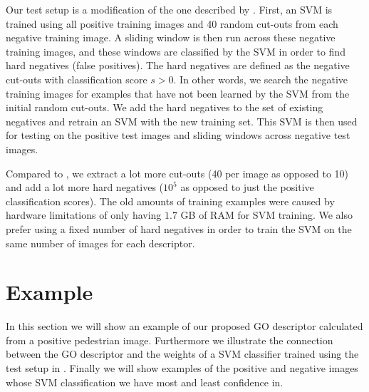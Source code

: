 \documentclass[thesis.tex]{subfiles}
\begin{document}
Our test setup is a modification of the one described by \citet{dalal2005histograms}. First, an SVM is trained using all positive training images and 40 random cut-outs from each negative training image. A sliding window is then run across these negative training images, and these windows are classified by the SVM in order to find hard negatives (false positives). The hard negatives are defined as the negative cut-outs with classification score $s > 0$. In other words, we search the negative training images for examples that have not been learned by the SVM from the initial random cut-outs. We add the hard negatives to the set of existing negatives and retrain an SVM with the new training set. This SVM is then used for testing on the positive test images and sliding windows across negative test images.

Compared to \citet{dalal2005histograms}, we extract a lot more cut-outs (40 per image as opposed to 10) and add a lot more hard negatives ($10^5$ as opposed to just the positive classification scores). The old amounts of training examples were caused by hardware limitations of only having $1.7$ GB of RAM for SVM training. We also prefer using a fixed number of hard negatives in order to train the SVM on the same number of images for each descriptor.

\section{Example}
%
In this section we will show an example of our proposed GO descriptor calculated from a positive pedestrian image. Furthermore we illustrate the connection between the GO descriptor and the weights of a SVM classifier trained using the test setup in .
Finally we will show examples of the positive and negative images whose SVM classification we have most and least confidence in.
\end{document}
